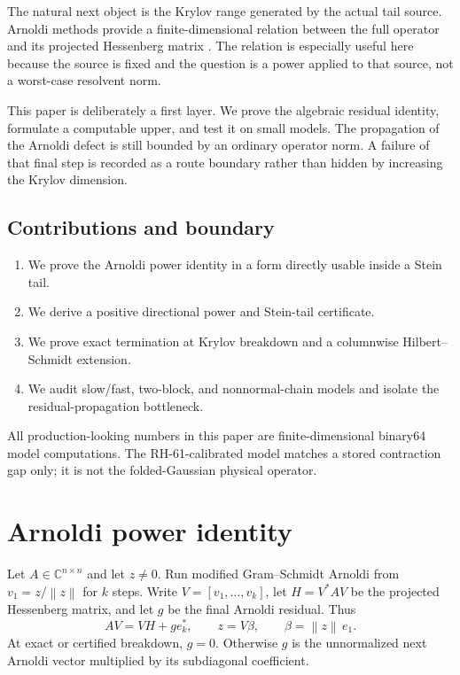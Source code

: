 \documentclass[11pt]{article}
\newcommand{\norm}[1]{\left\lVert#1\right\rVert}
\begin{document}
The natural next object is the Krylov range generated by the actual tail
source.  Arnoldi methods provide a finite-dimensional relation between the
full operator and its projected Hessenberg matrix
\citep{Saad2003,GolubVanLoan2013}.  The relation is especially useful here
because the source is fixed and the question is a power applied to that
source, not a worst-case resolvent norm.

This paper is deliberately a first layer.  We prove the algebraic residual
identity, formulate a computable upper, and test it on small models.  The
propagation of the Arnoldi defect is still bounded by an ordinary operator
norm.  A failure of that final step is recorded as a route boundary rather
than hidden by increasing the Krylov dimension.

\subsection*{Contributions and boundary}

\begin{enumerate}[leftmargin=2.2em]
 \item We prove the Arnoldi power identity in a form directly usable inside
       a Stein tail.
 \item We derive a positive directional power and Stein-tail certificate.
 \item We prove exact termination at Krylov breakdown and a columnwise
       Hilbert--Schmidt extension.
 \item We audit slow/fast, two-block, and nonnormal-chain models and isolate
       the residual-propagation bottleneck.
\end{enumerate}

All production-looking numbers in this paper are finite-dimensional
binary64 model computations.  The RH-61-calibrated model matches a stored
contraction gap only; it is not the folded-Gaussian physical operator.

\section{Arnoldi power identity}
\label{sec:identity}

Let $A\in\mathbb C^{n\times n}$ and let $z\ne0$.  Run modified
Gram--Schmidt Arnoldi from $v_1=z/\norm z$ for $k$ steps.  Write
$V=[v_1,\ldots,v_k]$, let $H=V^*AV$ be the projected Hessenberg matrix,
and let $g$ be the final Arnoldi residual.  Thus
\begin{equation}
 AV=VH+ge_k^*,
 \qquad z=V\beta,
 \qquad \beta=\norm z\,e_1.
 \label{eq:arnoldi}
\end{equation}
At exact or certified breakdown, $g=0$.  Otherwise $g$ is the unnormalized
next Arnoldi vector multiplied by its subdiagonal coefficient.
\end{document}
